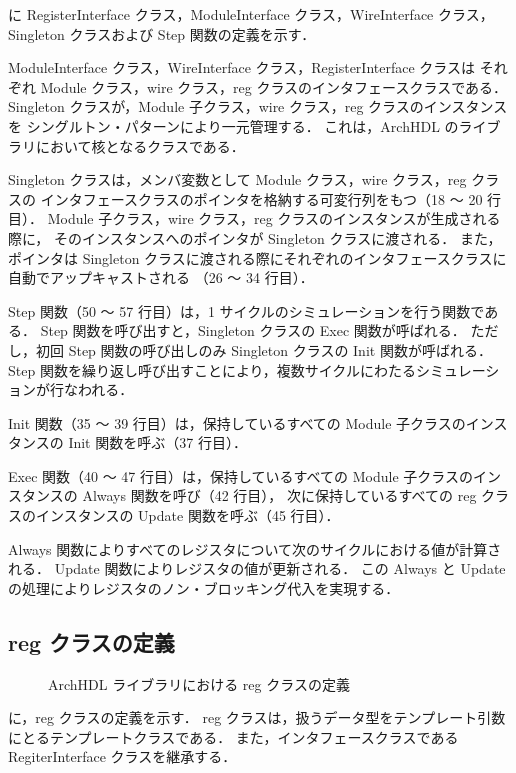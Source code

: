  に RegisterInterface クラス，ModuleInterface クラス，WireInterface クラス，
Singleton クラスおよび Step 関数の定義を示す．

ModuleInterface クラス，WireInterface クラス，RegisterInterface クラスは
それぞれ Module クラス，wire クラス，reg クラスのインタフェースクラスである．
Singleton クラスが，Module 子クラス，wire クラス，reg クラスのインスタンスを
シングルトン・パターンにより一元管理する．
これは，ArchHDL のライブラリにおいて核となるクラスである．

Singleton クラスは，メンバ変数として Module クラス，wire クラス，reg クラスの
インタフェースクラスのポインタを格納する可変行列をもつ（18 ～ 20 行目）．
Module 子クラス，wire クラス，reg クラスのインスタンスが生成される際に，
そのインスタンスへのポインタが Singleton クラスに渡される．
また，ポインタは Singleton クラスに渡される際にそれぞれのインタフェースクラスに自動でアップキャストされる
（26 ～ 34 行目）．

Step 関数（50 ～ 57 行目）は，1 サイクルのシミュレーションを行う関数である．
Step 関数を呼び出すと，Singleton クラスの Exec 関数が呼ばれる．
ただし，初回 Step 関数の呼び出しのみ Singleton クラスの Init 関数が呼ばれる．
Step 関数を繰り返し呼び出すことにより，複数サイクルにわたるシミュレーションが行なわれる．

Init 関数（35 ～ 39 行目）は，保持しているすべての Module 子クラスのインスタンスの Init 関数を呼ぶ（37 行目）．

Exec 関数（40 ～ 47 行目）は，保持しているすべての Module 子クラスのインスタンスの Always 関数を呼び（42 行目），
次に保持しているすべての reg クラスのインスタンスの Update 関数を呼ぶ（45 行目）．

Always 関数によりすべてのレジスタについて次のサイクルにおける値が計算される．
Update 関数によりレジスタの値が更新される．
この Always と Update の処理によりレジスタのノン・ブロッキング代入を実現する．


\subsection{reg クラスの定義}

\begin{figure}[tp]
 
 \caption{ArchHDL ライブラリにおける reg クラスの定義}
 \label{src:reg}
\end{figure}

 に，reg クラスの定義を示す．
reg クラスは，扱うデータ型をテンプレート引数にとるテンプレートクラスである．
また，インタフェースクラスである RegiterInterface クラスを継承する．

